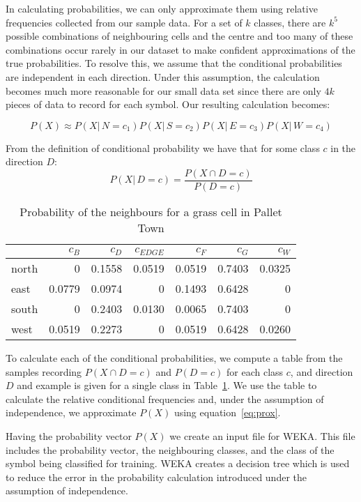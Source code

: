 In calculating probabilities, we can only approximate them using relative
frequencies collected from our sample data. For a set of $k$ classes, there are $k^5$ possible combinations of neighbouring
cells and the centre and too many of these combinations occur rarely in our dataset to make
confident approximations of the true probabilities. To resolve this, we assume that
the conditional probabilities are independent in each direction. Under this
assumption, the calculation becomes much more reasonable for our small data set
since there are only $4k$ pieces of data to record for each symbol.
Our resulting calculation becomes:

\begin{equation} \label{eq:prox}
P(X) \approx P(X|\,N\!=\!c_1)P(X|\,S\!=\!c_2)P(X|\,E\!=\!c_3)P(X|\,W\!=\!c_4)
\end{equation}

From the definition of conditional probability we have that for some class $c$ in
the direction $D$:
\[ P(X|\,D\!=\!c) = \frac{P(X \cap D\!=\!c)}{P(D=c)} \]

\begin{table}[h]
\label{table:relativefreq}
\begin{center}
\begin{tabular}{ l | r r r r r r }
              & $c_{B}$& $c_{D}$& $c_{EDGE}$& $c_{F}$& $c_{G}$& $c_{W}$ \\ 
              \hline
    north     & 0      & 0.1558 & 0.0519    & 0.0519 & 0.7403 & 0.0325\\
    east      & 0.0779 & 0.0974 & 0         & 0.1493 & 0.6428 & 0\\
    south     & 0      & 0.2403 & 0.0130    & 0.0065 & 0.7403 & 0\\
    west      & 0.0519 & 0.2273 & 0         & 0.0519 & 0.6428 & 0.0260\\
\end{tabular}
\caption{Probability of the neighbours for a grass cell in Pallet Town}
\end{center}
\end{table}


To calculate each of the conditional probabilities,
we compute a table from the samples recording $P(X\cap D\!=\!c)$ and $P(D\!=\!c)$ for each
class  $c$, and direction $D$ and example is given for a single class in Table~\ref{table:relativefreq}.
We use the table to calculate the relative conditional frequencies and, under the assumption
of independence, we approximate $P(X)$ using equation~\ref{eq:prox}.

Having the probability vector $P(X)$ we create an input file for WEKA.
This file includes the probability vector, the neighbouring classes, and the class of the
symbol being classified for training. WEKA creates a decision tree which is used to reduce the error in the probability
calculation introduced under the assumption of independence.

